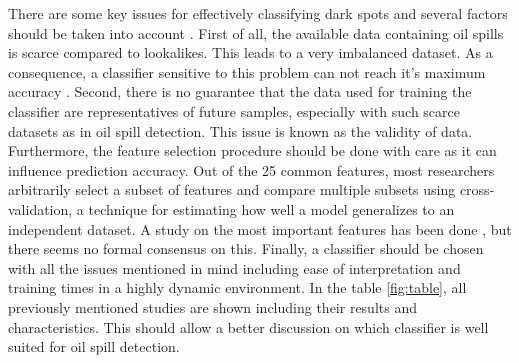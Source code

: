 There are some key issues for effectively classifying dark spots and several factors should be taken into account \cite{Kubat:1998:MLD:288808.288812}. First of all, the available data containing oil spills is scarce compared to lookalikes. This leads to a very imbalanced dataset. As a consequence, a classifier sensitive to this problem can not reach it's maximum accuracy \cite{Japkowicz20026}. Second, there is no guarantee that the data used for training the classifier are representatives of future samples, especially with such scarce datasets as in oil spill detection. This issue is known as the validity of data. Furthermore, the feature selection procedure should be done with care as it can influence prediction accuracy. Out of the 25 common features, most researchers arbitrarily select a subset of features and compare multiple subsets using cross-validation, a technique for estimating how well a model generalizes to an independent dataset. A study on the most important features has been done \cite{topouzelis2003oil}, but there seems no formal consensus on this. Finally, a classifier should be chosen with all the issues mentioned in mind including ease of interpretation and training times in a highly dynamic environment. In the table \ref{fig:table}, all previously mentioned studies are shown including their results and characteristics. This should allow a better discussion on which classifier is well suited for oil spill detection.\\

